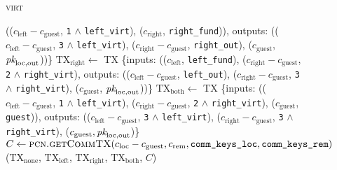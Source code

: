 \begin{figure}[H]
\begin{processbox}{\textsc{virt}}
\begin{algorithmic}[1]
        (($c_{\mathrm{left}} - c_{\mathrm{guest}}$, \texttt{1} $\wedge$
        \texttt{left\_virt}), ($c_{\mathrm{right}}$, \texttt{right\_fund})),
        outputs: (($c_{\mathrm{left}} - c_{\mathrm{guest}}$, \texttt{3} $\wedge$
        \texttt{left\_virt}), ($c_{\mathrm{right}} - c_{\mathrm{guest}}$,
        \texttt{right\_out}), ($c_{\mathrm{guest}}$, $\textit{pk}_{\mathrm{loc},
        \mathrm{out}}$))\}
        \State $\mathrm{TX}_{\mathrm{right}} \gets$ TX \{inputs:
        (($c_{\mathrm{left}}$, \texttt{left\_fund}), ($c_{\mathrm{right}} -
        c_{\mathrm{guest}}$, \texttt{2} $\wedge$ \texttt{right\_virt}), outputs:
        (($c_{\mathrm{left}} - c_{\mathrm{guest}}$, \texttt{left\_out}),
        ($c_{\mathrm{right}} - c_{\mathrm{guest}}$, \texttt{3} $\wedge$
        \texttt{right\_virt}), ($c_{\mathrm{guest}}$, $\textit{pk}_{\mathrm{loc},
        \mathrm{out}}$))\}
        \State $\mathrm{TX}_{\mathrm{both}} \gets$ TX \{inputs:
        (($c_{\mathrm{left}} - c_{\mathrm{guest}}$, \texttt{1} $\wedge$
        \texttt{left\_virt}), ($c_{\mathrm{right}} - c_{\mathrm{guest}}$,
        \texttt{2} $\wedge$ \texttt{right\_virt}), ($c_{\mathrm{guest}}$,
        \texttt{guest})), outputs: (($c_{\mathrm{left}} - c_{\mathrm{guest}}$,
        \texttt{3} $\wedge$ \texttt{left\_virt}), ($c_{\mathrm{right}} -
        c_{\mathrm{guest}}$, \texttt{3} $\wedge$ \texttt{right\_virt}),
        ($c_{\mathrm{guest}}, \textit{pk}_{\mathrm{loc}, \mathrm{out}}$)\}
        \State $C \gets \textsc{pcn.getCommTX}(c_{\mathrm{loc}} -
        c_{\mathrm{guest}}, c_{\mathrm{rem}}, \texttt{comm\_keys\_loc},
        \texttt{comm\_keys\_rem})$
        \State \Return ($\mathrm{TX}_{\mathrm{none}}$,
        $\mathrm{TX}_{\mathrm{left}}$, $\mathrm{TX}_{\mathrm{right}}$,
        $\mathrm{TX}_{\mathrm{both}}$, $C$)
      \EndIndent
    \end{algorithmic}
  \end{processbox}
  \caption{}
  \label{code:virtual-layer:mid-txs}
\end{figure}

